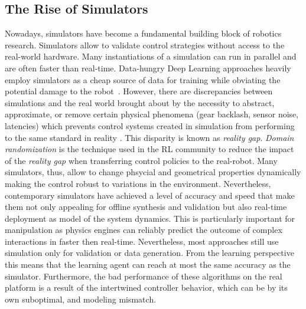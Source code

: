 \subsection{The Rise of Simulators}
Nowadays, simulators have become a fundamental building block of robotics research. Simulators allow to validate control strategies without access to the real-world hardware. Many instantiations of a simulation can run in parallel and are often faster than real-time. Data-hungry Deep Learning approaches heavily employ simulators as a cheap source of data for training while obviating the potential damage to the robot~\cite{liang_gpu-accelerated_2018}. However, there are discrepancies between simulations and the real world brought about by the necessity to abstract, approximate, or remove certain physical phenomena (gear backlash, sensor noise, latencies) which prevents control systems created in simulation from performing to the same standard in reality \cite{collins_benchmarking_2020}. This disparity is known as \emph{reality gap}. \emph{Domain randomization} is the technique used in the RL community to reduce the impact of the \emph{reality gap} when transferring control policies to the real-robot. Many simulators, thus, allow to change phsycial and geometrical properties dynamically making the control robust to variations in the environment. Nevertheless, contemporary simulators have achieved a level of accuracy and speed that make them not only appealing for offline synthesis and validation but also real-time deployment as model of the system dynamics. This is particularly important for manipulation as physics engines can reliably predict the outcome of complex interactions in faster then real-time. Nevertheless, most approaches still use simulation only for validation or data generation. From the learning perspective this means that the learning agent can reach at most the same accuracy as the simulator. Furthermore, the bad performance of these algorithms on the real platform is a result of the intertwined controller behavior, which can be by its own suboptimal, and modeling mismatch.   

